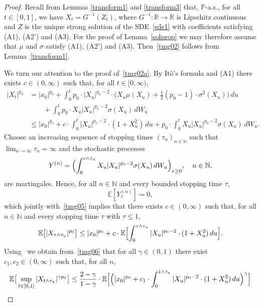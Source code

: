 \documentclass[11pt]{amsart}
\newcommand{\R}{{\mathbb R}}
\newcommand{\N}{{\mathbb N}}
\newcommand{\EE}{{\mathbb E}}
\newcommand{\PP}{{\mathbb P}}
\theoremstyle{plain}
\theoremstyle{definition}
\begin{document}
\begin{proof}
Recall from
Lemmas \ref{transform1} and \ref{transform3}
that, $\PP$-a.s., for all $t\in[0,1]$, we have  $X_t=G^{-1}(Z_t)$, where $G^{-1}\colon\R\to\R$
 is Lipschitz continuous and $Z$ is the unique strong solution of the SDE~\eqref{sde1} with coefficients satisfying (A1), (A2') and (A3). For the proof of Lemma~\ref{solprop} we may therefore assume that $\mu$ and $\sigma$ satisfy (A1), (A2') and (A3).
Then~\eqref{tmg02} follows from Lemma~\ref{transform1}.

We turn our attention to the proof of~\eqref{tmg02a}.
By It\^{o}'s formula and (A1) there exists $c\in (0,\infty)$ such that,  for all $t\in [0,\infty)$,
\begin{equation}\label{tmg05}
\begin{aligned}
|X_t|^{p_0} & = |x_0|^{p_0}
+\int_0^t p_0\cdot |X_u|^{p_0-2}\cdot \bigl( X_u  \mu(X_u) + \frac{1}{2}  (p_0-1) \cdot \sigma^2(X_u)\bigr)\, du \\
& \qquad +  \int_0^t p_0 \cdot X_u |X_u|^{p_0-2} \sigma(X_u)\, dW_u\\
&  \le  |x_0|^{p_0}+c\cdot \int_0^t |X_u|^{p_0-2}\cdot  (1+X_u^2)\, du +  p_0\cdot \int_0^t  X_u |X_u|^{p_0-2} \sigma(X_u)\, dW_u.
\end{aligned}
\end{equation}
Choose an increasing sequence of stopping times $(\tau_n)_{n\in\N}$ such that $\lim_{n\to\infty} \tau_n = \infty$ and the stochastic processes
\begin{equation}\label{tmg10}
Y^{(n)} = \Bigl(\int_0^{v\wedge\tau_n} X_u|X_u|^{p_0-2}\sigma(X_u)\, dW_u\Bigr)_{v\ge 0},\quad n\in\N,
\end{equation}
are martingales. Hence, for all $n\in\N$ and every bounded stopping time $\tau$,
\[
\EE[Y^{(n)}_\tau] = 0,
\]
which jointly with~\eqref{tmg05} implies that there exists $c\in (0,\infty)$ such that, for all $n\in\N$ and every stopping time $\tau$ with $ \tau \le 1$,
\begin{equation}\label{tmg06}
\EE\bigl[|X_{\tau\wedge \tau_n}|^{p_0}\bigr] \le |x_0|^{p_0}+c\cdot \EE\Bigl[ \int_0^{\tau\wedge \tau_n} |X_u|^{p_0-2}  \cdot (1+X_u^2)\, du\Bigr].
\end{equation}
Using~\cite[Lemma 3.2]{gk03b} we obtain from~\eqref{tmg06} that for all $\gamma\in (0,1)$ there exist $c_1,  c_2\in (0,\infty)$ such that, for all $n$,
\begin{equation}\label{tmg10i}
\begin{aligned}
\EE\bigl[\,\sup_{t\in[0,1]}|X_{t\wedge \tau_n}|^{\gamma p_0}\bigr] & \le \frac{2-\gamma}{1-\gamma}\cdot  \EE\Bigl[\Bigl(|x_0|^{p_0}+ c_1 \cdot\int_0^{1\wedge \tau_n} |X_u|^{p_0-2}  \cdot(1+X_u^2)\, du\Bigr)^\gamma\Bigr]\\

\end{aligned}
\end{equation}
\end{proof}
\end{document}
